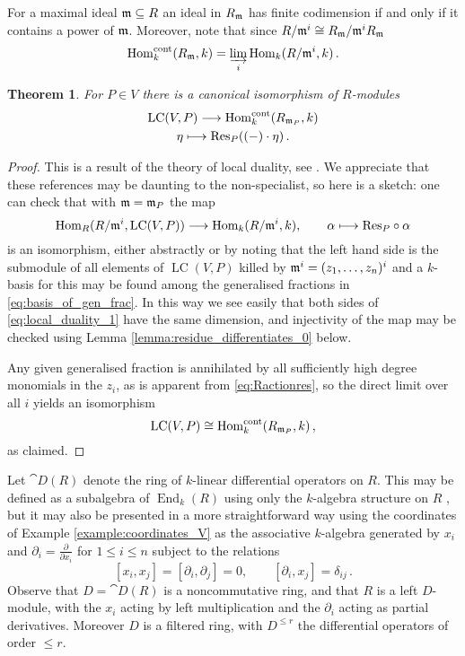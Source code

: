 \documentclass[english,letter paper,12pt,reqno]{article}
\newtheorem{theorem}{Theorem}[section]
\theoremstyle{example}
\numberwithin{equation}{section}
\def\Hom{\operatorname{Hom}}
\DeclareMathOperator{\End}{End}
\DeclareMathOperator{\LC}{LC}
\begin{document}
For a maximal ideal $\mathfrak{m} \subseteq R$ an ideal in $R_{\mathfrak{m}}$ has finite codimension if and only if it contains a power of $\mathfrak{m}$. Moreover, note that since $R/\mathfrak{m}^i \cong R_{\mathfrak{m}}/\mathfrak{m}^i R_{\mathfrak{m}}$
\begin{equation}\label{eq:contmap}
\Hom_k^{\cont}(R_{\mf{m}},k) = \varinjlim_i \Hom_k( R/\mf{m}^i, k)\,.
\end{equation}

\begin{theorem}\label{theorem:lcwithcontmap} For $P \in V$ there is a canonical isomorphism of $R$-modules
\begin{gather}
\LC(V,P) \lto \Hom_k^{\cont}(R_{\mf{m}_P},k)\label{eq:local_duality}\\
\eta \longmapsto \Res_P( ( - ) \cdot \eta )\,.\nonumber
\end{gather}
\end{theorem}
\begin{proof}
This is a result of the theory of local duality, see \cite{Lipman01, Kunz08}. We appreciate that these references may be daunting to the non-specialist, so here is a sketch: one can check that with $\mathfrak{m} = \mathfrak{m}_P$ the map
\begin{equation}\label{eq:local_duality_1}
\Hom_R( R/\mf{m}^i, \LC(V,P) ) \lto \Hom_k( R/\mf{m}^i, k ), \qquad \alpha \longmapsto \Res_P \circ \alpha
\end{equation}
is an isomorphism, either abstractly \cite[Proposition 0.4]{Salas02} or by noting that the left hand side is the submodule of all elements of $\LC(V,P)$ killed by $\mathfrak{m}^i = (z_1,\ldots,z_n)^i$ and a $k$-basis for this may be found among the generalised fractions in \eqref{eq:basis_of_gen_frac}. In this way we see easily that both sides of \eqref{eq:local_duality_1} have the same dimension, and injectivity of the map may be checked using Lemma \ref{lemma:residue_differentiates_0} below.

Any given generalised fraction is annihilated by all sufficiently high degree monomials in the $z_i$, as is apparent from \eqref{eq:Ractionres}, so the direct limit over all $i$ yields an isomorphism
\[
\LC(V,P) \cong \Hom_k^{\cont}(R_{\mf{m}_P}, k)\,,
\]
as claimed.
\end{proof}

Let $\cat{D}(R)$ denote the ring of $k$-linear differential operators on $R$. This may be defined as a subalgebra of $\End_k(R)$ using only the $k$-algebra structure on $R$ \cite{milicic}, but it may also be presented in a more straightforward way using the coordinates of Example \ref{example:coordinates_V} as the associative $k$-algebra generated by $x_i$ and $\partial_i = \frac{\partial}{\partial x_i}$ for $1 \le i \le n$ subject to the relations
\[
[x_i, x_j] = [\partial_i, \partial_j] = 0, \qquad [\partial_i, x_j] = \delta_{ij}\,.
\]
Observe that $D = \cat{D}(R)$ is a noncommutative ring, and that $R$ is a left $D$-module, with the $x_i$ acting by left multiplication and the $\partial_i$ acting as partial derivatives. Moreover $D$ is a filtered ring, with $D^{\le r}$ the differential operators of order $\le r$.
\end{document}
